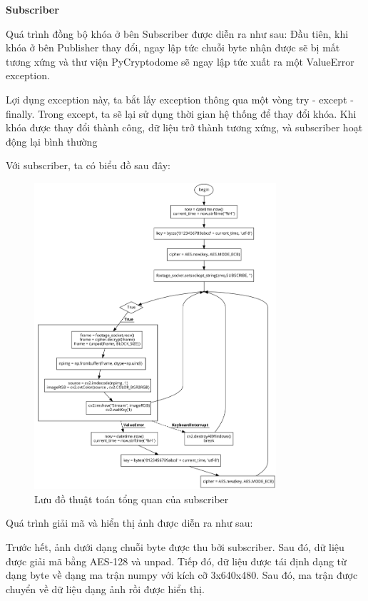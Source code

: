 \documentclass{article}
\begin{document}
\textbf{Subscriber}

Quá trình đồng bộ khóa ở bên Subscriber được diễn ra như sau: Đầu tiên, khi khóa ở bên Publisher thay đổi, ngay lập tức chuỗi byte nhận được sẽ bị mất tương xứng và thư viện PyCryptodome sẽ ngay lập tức xuất ra một ValueError exception.

Lợi dụng exception này, ta bắt lấy exception thông qua một vòng try - except - finally. Trong except, ta sẽ lại sử dụng thời gian hệ thống để thay đổi khóa. Khi khóa được thay đổi thành công, dữ liệu trở thành tương xứng, và subscriber hoạt động lại bình thường 

Với subscriber, ta có biểu đồ sau đây:

\begin{figure}[H] 
    \centering
    \includegraphics[width=0.8\textwidth]{sub_main_op.png}
    \caption{Lưu đồ thuật toán tổng quan của subscriber}
    \label{fig:sub}
\end{figure}

Quá trình giải mã và hiển thị ảnh được diễn ra như sau:

Trước hết, ảnh dưới dạng chuỗi byte được thu bởi subscriber. Sau đó, dữ liệu được giải mã bằng AES-128 và unpad. Tiếp đó, dữ liệu được tái định dạng từ dạng byte về dạng ma trận numpy với kích cỡ 3x640x480. Sau đó, ma trận được chuyển về dữ liệu dạng ảnh rồi được hiển thị.
\end{document}
